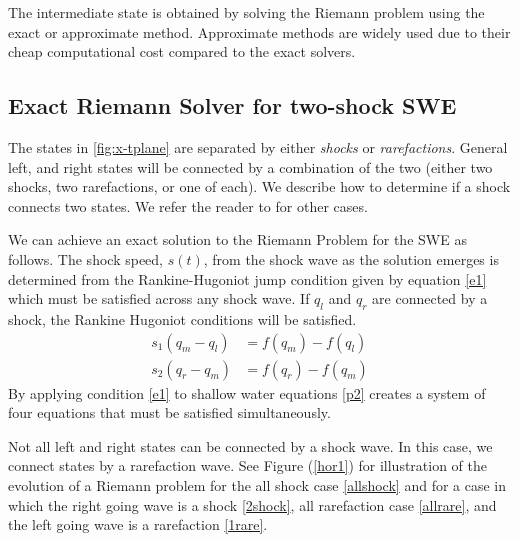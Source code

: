 \documentclass[11pt,a4paper]{article}
\newcommand{\donna}[1]{{\color{red}{#1}}}
\begin{document}
	\donna{Add x-axis and y-axis labels to figure.}
	
	The intermediate state is obtained by solving the Riemann problem using the exact or approximate method. Approximate methods are widely used due to their cheap computational cost compared to the exact solvers\cite{bu-ku-we-da:2009}.
	
	\donna{Include a three or four plots showing initial conditions, and the evolution of a shock and rarefaction. }

	\subsection{Exact Riemann Solver for two-shock SWE}
The states in \ref{fig:x-tplane} are separated by either {\em shocks} or {\em rarefactions}. General left, and right states will be connected by a combination of the two (either two shocks, two rarefactions, or one of each).  We describe how to determine if a shock connects two states.  We refer the reader to \cite{leveque2002finite} for other cases. 

We can achieve an exact solution to the Riemann Problem for the SWE as follows. 
The shock speed, $s(t)$,  from the shock wave as the solution emerges is determined from the Rankine-Hugoniot jump condition given by equation \eqref{e1}  which must be satisfied across any shock wave.  If $q_l$ and $q_r$ are connected by a shock, the Rankine Hugoniot conditions will be satisfied\cite{ma-ah-be-ca-ge-ha-ke-le-le:2016}. 
	\begin{equation}
		\begin{aligned}
			s_1(q_{m} - q_{l}) & = f(q_{m}) - f(q_{l}) \\
			s_2(q_{r} - q_{m}) & = f(q_{r}) - f(q_{m})
		\end{aligned}
		\label{e1}
	\end{equation}
	By applying condition  \eqref{e1} to shallow water equations \eqref{p2}  creates a system of four equations that must be satisfied simultaneously. 
	
	Not all left and right states can be connected by a shock wave.  In this case, we connect states by a rarefaction wave. See Figure (\ref{hor1})  for illustration of the evolution of a Riemann problem for the all shock case \ref{allshock} and for a case in which the right going wave is a shock \ref{2shock}, all rarefaction case \ref{allrare}, and the left going wave is a rarefaction \ref{1rare}.
	
\end{document}
